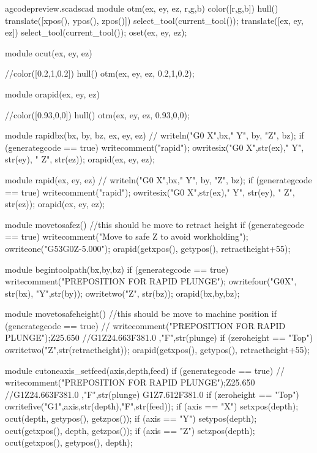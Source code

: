 \documentclass{ltxdoc}
\begin{document}
\lstset{firstnumber=\thegcpscad}
\begin{writecode}{a}{gcodepreview.scad}{scad}
module otm(ex, ey, ez, r,g,b) {
color([r,g,b]) hull(){
    translate([xpos(), ypos(), zpos()]){
      select_tool(current_tool());
    }
    translate([ex, ey, ez]){
      select_tool(current_tool());
    }
  }
oset(ex, ey, ez);
}

module ocut(ex, ey, ez) {
  //color([0.2,1,0.2]) hull(){
  otm(ex, ey, ez, 0.2,1,0.2);
}

module orapid(ex, ey, ez) {
  //color([0.93,0,0]) hull(){
  otm(ex, ey, ez, 0.93,0,0);
}

module rapidbx(bx, by, bz, ex, ey, ez) {
  //    writeln("G0 X",bx," Y", by, "Z", bz);
  if (generategcode == true) {
    writecomment("rapid");
    owritesix("G0 X",str(ex)," Y", str(ey), " Z", str(ez));
  }
    orapid(ex, ey, ez);
}

module rapid(ex, ey, ez) {
  //    writeln("G0 X",bx," Y", by, "Z", bz);
  if (generategcode == true) {
      writecomment("rapid");
      owritesix("G0 X",str(ex)," Y", str(ey), " Z", str(ez));
  }
  orapid(ex, ey, ez);
}

module movetosafez() {
  //this should be move to retract height
  if (generategcode == true) {
      writecomment("Move to safe Z to avoid workholding");
      owriteone("G53G0Z-5.000");
  }
  orapid(getxpos(), getypos(), retractheight+55);
}

module begintoolpath(bx,by,bz) {
  if (generategcode == true) {
    writecomment("PREPOSITION FOR RAPID PLUNGE");
    owritefour("G0X", str(bx), "Y",str(by));
    owritetwo("Z", str(bz));
  }
  orapid(bx,by,bz);
}

module movetosafeheight() {
  //this should be move to machine position
  if (generategcode == true) {
  //    writecomment("PREPOSITION FOR RAPID PLUNGE");Z25.650
  //G1Z24.663F381.0 ,"F",str(plunge)
    if (zeroheight == "Top") {
      owritetwo("Z",str(retractheight));
    }
  }
    orapid(getxpos(), getypos(), retractheight+55);
}

module cutoneaxis_setfeed(axis,depth,feed) {
  if (generategcode == true) {
  //    writecomment("PREPOSITION FOR RAPID PLUNGE");Z25.650
  //G1Z24.663F381.0 ,"F",str(plunge) G1Z7.612F381.0
    if (zeroheight == "Top") {
      owritefive("G1",axis,str(depth),"F",str(feed));
    }
  }
  if (axis == "X") {setxpos(depth);
    ocut(depth, getypos(), getzpos());}
    if (axis == "Y") {setypos(depth);
      ocut(getxpos(), depth, getzpos());
    }
      if (axis == "Z") {setzpos(depth);
        ocut(getxpos(), getypos(), depth);
      }
}

}}
\end{writecode}
\end{document}
